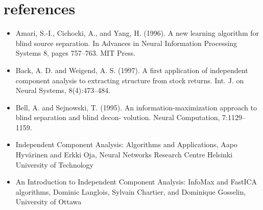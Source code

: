 \documentclass[12pt, a4paper, onecolumn]{IEEEtran}
\begin{document}
\section{references}
\begin{itemize}
\item{Amari, S.-I., Cichocki, A., and Yang, H. (1996). A new learning algorithm for blind source separation. In Advances in Neural Information Processing Systems 8, pages 757–763. MIT Press.}
\item{Back, A. D. and Weigend, A. S. (1997). A first application of independent component analysis to extracting structure from stock returns. Int. J. on Neural Systems, 8(4):473–484.}
\item{Bell, A. and Sejnowski, T. (1995). An information-maximization approach to blind separation and blind decon- volution. Neural Computation, 7:1129–1159.}
\item{Independent Component Analysis: Algorithms and Applications, Aapo Hyvärinen and Erkki Oja, Neural Networks Research Centre Helsinki University of Technology }
\item{An Introduction to Independent Component Analysis: InfoMax and FastICA algorithms, Dominic Langlois, Sylvain Chartier, and Dominique Gosselin, University of Ottawa}
\end{itemize}
\end{document}
